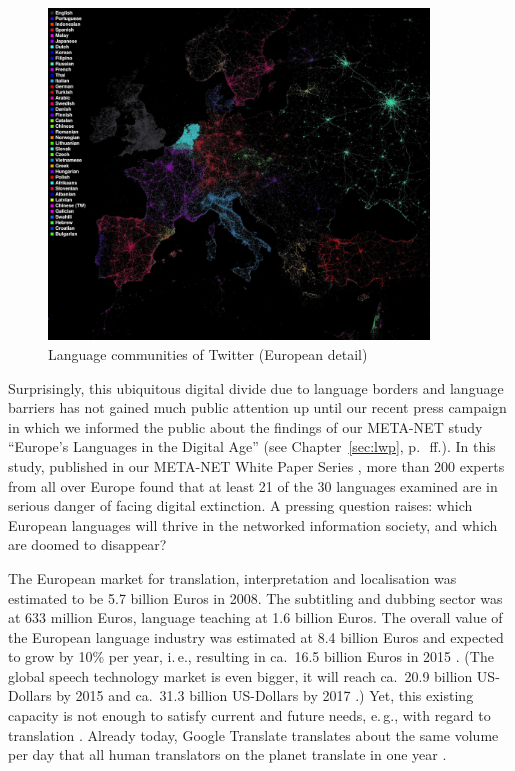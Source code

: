 \documentclass[10pt, plain]{../../metanetpaper}
\begin{document}
\begin{multicols}{2}
\begin{figure}[htb]
  \center
  \includegraphics[width=0.9\textwidth]{../_media/twitter-languages-europe}
  \caption{Language communities of Twitter (European detail)}
  \label{fig:european-languages-in-twitter}
\end{figure}

Surprisingly, this ubiquitous digital divide due to language borders and language barriers has not gained much public attention up until our recent press campaign in which we informed the public about the findings of our META-NET study ``Europe's Languages in the Digital Age'' (see Chapter~\ref{sec:lwp}, p.~\pageref{sec:lwp}\,ff.). In this study, published in our META-NET White Paper Series \cite{LWP2012}, more than 200 experts from all over Europe found that at least 21 of the 30 languages examined are in serious danger of facing digital extinction. A pressing question raises: which European languages will thrive in the networked information society, and which are doomed to disappear?

The European market for translation, interpretation and localisation was estimated to be 5.7 billion Euros in 2008. The subtitling and dubbing sector was at 633 million Euros, language teaching at 1.6 billion Euros. The overall value of the European language industry was estimated at 8.4 billion Euros and expected to grow by 10\% per year, i.\,e., resulting in ca.~16.5 billion Euros in 2015 \cite{EC3}. (The global speech technology market is even bigger, it will reach ca.~20.9 billion US-Dollars by 2015 and ca.~31.3 billion US-Dollars by 2017 \cite{gia2012}.) Yet, this existing capacity is not enough to satisfy current and future needs, e.\,g., with regard to translation \cite{csa2009}. Already today, Google Translate translates about the same volume per day that all human translators on the planet translate in one year \cite{och12}.


\end{multicols}
\end{document}
